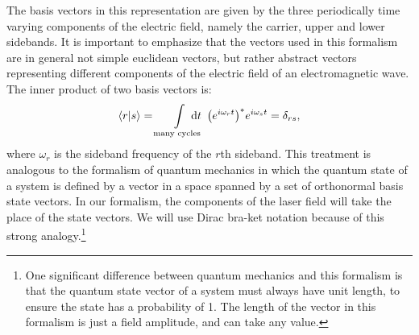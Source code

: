 The basis vectors in this representation are given by the three periodically time varying components of the electric field, namely the carrier, upper and lower sidebands. %
It is important to emphasize that the vectors used in this formalism are in general not simple euclidean vectors, but rather abstract vectors representing different components of the electric field of an electromagnetic wave. %
The inner product of two basis vectors is:
\[
\inprod{r}{s} = \int\limits_{\text{many cycles}}\! \! \! \! \! \! \! \! \!
\dd t \; \: {\left( e^{i\omega_{r}t}\right)^*}e^{i\omega_{s}t} = \delta_{rs},
\]
where $\omega_r$ is the sideband frequency of the $r$th sideband. %
This treatment is analogous to the formalism of quantum mechanics in which the quantum state of a system is defined by a vector in a space spanned by a set of orthonormal basis state vectors. %
In our formalism, the components of the laser field will take the place of the state vectors. %
We will use Dirac bra-ket notation because of this strong analogy.\footnote{One significant difference between quantum mechanics and this formalism is that the quantum state vector of a system must always have unit length, to ensure the state has a probability of 1. %
The length of the vector in this formalism is just a field amplitude, and can take any value.}

